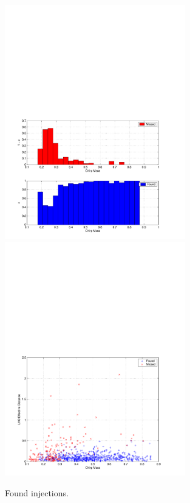 
\begin{figure}[p]
\begin{center}
\includegraphics[width=0.7\textwidth]{figures/result/mchirp_eff} \\
\includegraphics[width=0.7\textwidth]{figures/result/mchirp_found_missed}
\end{center}
\caption{\label{f:mchirp_eff}%
Found injections.
}
\end{figure}

